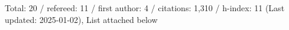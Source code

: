 Total: 20 / refereed: 11 / first author: 4 / citations: 1,310 / h-index: 11 (Last updated: 2025-01-02), List attached below
